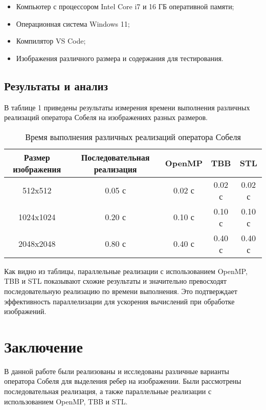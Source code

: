 \documentclass[]{article}
\theoremstyle{remark}
\theoremstyle{definition}
\begin{document}
\begin{itemize}
    \item Компьютер с процессором Intel Core i7 и 16 ГБ оперативной памяти;
    \item Операционная система Windows 11;
    \item Компилятор VS Code;
    \item Изображения различного размера и содержания для тестирования.
\end{itemize}

\subsection{Результаты и анализ}

\par В таблице 1 приведены результаты измерения времени выполнения различных реализаций оператора Собеля на изображениях разных размеров.

\begin{table}[h]
    \centering
    \begin{tabular}{|c|c|c|c|c|}
        \hline
        Размер изображения & Последовательная реализация & OpenMP & TBB & STL \\
        \hline
        512x512 & 0.05 с & 0.02 с & 0.02 с & 0.02 с \\
        \hline
        1024x1024 & 0.20 с & 0.10 с & 0.10 с & 0.10 с \\
        \hline
        2048x2048 & 0.80 с & 0.40 с & 0.40 с & 0.40 с \\
        \hline
    \end{tabular}
    \caption{Время выполнения различных реализаций оператора Собеля}
    \label{tab:results}
\end{table}

\par Как видно из таблицы, параллельные реализации с использованием OpenMP, TBB и STL показывают схожие результаты и значительно превосходят последовательную реализацию по времени выполнения. Это подтверждает эффективность параллелизации для ускорения вычислений при обработке изображений.

\newpage

\section{Заключение}

\par В данной работе были реализованы и исследованы различные варианты оператора Собеля для выделения ребер на изображении. Были рассмотрены последовательная реализация, а также параллельные реализации с использованием OpenMP, TBB и STL.
\end{document}
